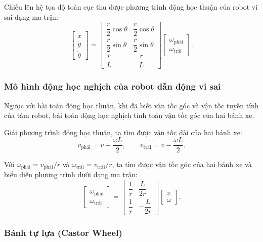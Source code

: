 \documentclass[12pt,a4paper,oneside]{report}
\begin{document}
Chiếu lên hệ tọa độ toàn cục thu được phương trình động học thuận của robot vi sai dạng ma trận:
\[
  \begin{bmatrix}\dot{x}\\\dot{y}\\\dot{\theta}\end{bmatrix}
  =\begin{bmatrix}
    \dfrac{r}{2}\cos\theta & \dfrac{r}{2}\cos\theta\\[6pt]
    \dfrac{r}{2}\sin\theta & \dfrac{r}{2}\sin\theta\\[6pt]
    \dfrac{r}{L} & -\dfrac{r}{L}
  \end{bmatrix}
  \begin{bmatrix}\omega_{\text{phải}}\\\omega_{\text{trái}}\end{bmatrix}.
\]

\subsubsection{Mô hình động học nghịch của robot dẫn động vi sai}

Ngược với bài toán động học thuận, khi đã biết vận tốc góc và vận tốc tuyến tính của tâm robot, bài toán động học nghịch tính toán vận tốc góc của hai bánh xe.

Giải phương trình động học thuận, ta tìm được vận tốc dài của hai bánh xe:
\[
  v_{\text{phải}}=v+\frac{\omega L}{2},
  \qquad
  v_{\text{trái}}=v-\frac{\omega L}{2}.
\]

Với \(\omega_{\text{phải}}=v_{\text{phải}}/r\) và \(\omega_{\text{trái}}=v_{\text{trái}}/r\), ta tìm được vận tốc góc của hai bánh xe và biểu diễn phương trình dưới dạng ma trận:
\[
  \begin{bmatrix}\omega_{\text{phải}}\\\omega_{\text{trái}}\end{bmatrix}
  =\begin{bmatrix}
    \dfrac{1}{r} & \dfrac{L}{2r}\\[6pt]
    \dfrac{1}{r} & -\dfrac{L}{2r}
  \end{bmatrix}
  \begin{bmatrix}v\\\omega\end{bmatrix}.
\]

\subsubsection{Bánh tự lựa (Castor Wheel)}
\end{document}
